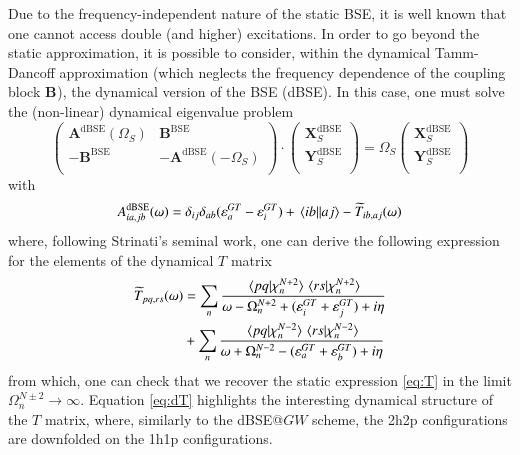 \documentclass[aip,jcp,reprint,noshowkeys,superscriptaddress]{revtex4-1}
\newcommand{\BSE}{\text{BSE}}
\newcommand{\dBSE}{\text{dBSE}}
\newcommand{\GT}{GT}
\newcommand{\e}[2]{\eps_{#1}^{#2}}
\newcommand{\Om}[2]{\Omega_{#1}^{#2}}
\newcommand{\bA}[2]{\mathbf{A}_{#1}^{#2}}
\newcommand{\bB}[2]{\mathbf{B}_{#1}^{#2}}
\newcommand{\bX}[2]{\mathbf{X}_{#1}^{#2}}
\newcommand{\bY}[2]{\mathbf{Y}_{#1}^{#2}}
\newcommand{\eps}{\varepsilon}
\begin{document}
Due to the frequency-independent nature of the static BSE, it is well known that one cannot access double (and higher) excitations.
\cite{Loos_2019,Romaniello_2009b,Sangalli_2011,Loos_2020h,Authier_2020,Monino_2021}
In order to go beyond the static approximation, it is possible to consider,  within the dynamical Tamm-Dancoff approximation (which neglects the frequency dependence of the coupling block $\bB{}{}$), the dynamical version of the BSE (dBSE). \cite{Strinati_1988,Romaniello_2009b,Loos_2020h}
In this case, one must solve the (non-linear) dynamical eigenvalue problem
\begin{equation}
\label{eq:dBSE}
	\begin{pmatrix}
		\bA{}{\dBSE}(\Om{S}{})	&	\bB{}{\BSE}	\\
		-\bB{}{\BSE}	&	-\bA{}{\dBSE}(-\Om{S}{})	\\
	\end{pmatrix}
	\cdot
	\begin{pmatrix}
		\bX{S}{\dBSE}	\\
		\bY{S}{\dBSE}	\\
	\end{pmatrix}
	=
	\Om{S}{}
	\begin{pmatrix}
		\bX{S}{\dBSE}	\\
		\bY{S}{\dBSE}	\\
	\end{pmatrix}
\end{equation}
with 
\begin{equation}
	A_{ia,jb}^{\dBSE}(\omega) = \delta_{ij} \delta_{ab} (\e{a}{\GT} - \e{i}{\GT}) + \mel{ib}{}{aj} - \widetilde{T}_{ib,aj}(\omega)
\end{equation}
where, following Strinati's seminal work, \cite{Strinati_1988} one can derive the following expression for the elements of the dynamical $T$ matrix
\begin{equation}
\label{eq:dT}
\begin{split}
	\widetilde{T}_{pq,rs}(\omega) 
		& = \sum_{n} \frac{\braket*{pq}{\chi_n^{N+2}}\braket*{rs}{\chi_n^{N+2}}}{\omega - \Om{n}{N+2} + (\e{i}{\GT} + \e{j}{\GT}) + i\eta}
		\\
		& + \sum_{n} \frac{\braket*{pq}{\chi_n^{N-2}}\braket*{rs}{\chi_n^{N-2}}}{\omega + \Om{n}{N-2} - (\e{a}{\GT} + \e{b}{\GT}) + i\eta}
\end{split}
\end{equation}
from which, one can check that we recover the static expression \eqref{eq:T} in the limit $\Om{n}{N\pm2} \to \infty$.
Equation \eqref{eq:dT} highlights the interesting dynamical structure of the $T$ matrix, where, similarly to the dBSE@$GW$ scheme, \cite{Strinati_1988,Romaniello_2009b,Loos_2020h} the 2h2p configurations are downfolded on the 1h1p configurations. \cite{Bintrim_2021b}
\end{document}
